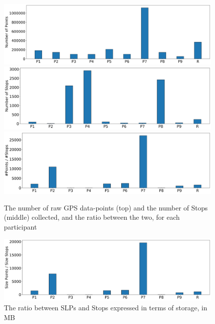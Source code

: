\begin{figure}
    \centering
    \includegraphics[width=\textwidth]{images/study/storage/num_points.png}
    \includegraphics[width=\textwidth]{images/study/storage/num_stops.png}
    \includegraphics[width=\textwidth]{images/study/storage/compression_N.png}
    \caption{The number of raw GPS data-points (top) and the number of Stops (middle) collected, and the ratio between the two, for each participant}
    \label{fig:plot-num-points-stops}
\end{figure}

\begin{figure}
    \centering
    
    \includegraphics[width=\textwidth]{images/study/storage/compression_mb.png}
    \caption{The ratio between SLPs and Stops expressed in terms of storage, in MB}
    \label{fig:plot-num-points-stops}
\end{figure}


